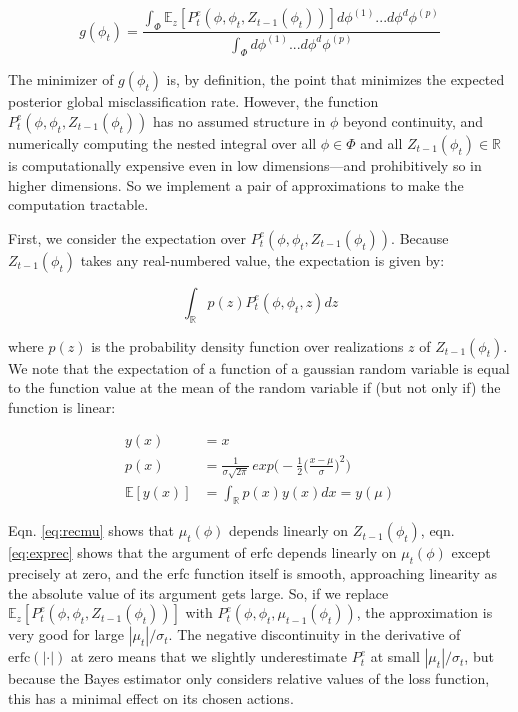 \documentclass[12pt, conference]{IEEEtran}
\begin{document}
\begin{equation}
    g(\phi_t) = \frac{\int_\Phi \mathbb{E}_{z}[P_t^e(\phi,\phi_t,Z_{t-1}(\phi_t))] d\phi^{(1)}...d\phi^d\phi^{(p)}}{\int_\Phi d\phi^{(1)}...d\phi^d\phi^{(p)}}
    \label{eq:objfull}
\end{equation}
\smallskip

The minimizer of $g(\phi_t)$ is, by definition, the point that minimizes the expected posterior global misclassification rate. However, the function $P_t^e(\phi,\phi_t,Z_{t-1}(\phi_t))$ has no assumed structure in $\phi$ beyond continuity, and numerically computing the nested integral over all $\phi\in\Phi$ and all $Z_{t-1}(\phi_t)\in\mathbb{R}$ is computationally expensive even in low dimensions---and prohibitively so in higher dimensions. So we implement a pair of approximations to make the computation tractable.

First, we consider the expectation over $P_t^e(\phi,\phi_t,Z_{t-1}(\phi_t))$. Because $Z_{t-1}(\phi_t)$ takes any real-numbered value, the expectation is given by:

\begin{equation}
    \int_\mathbb{R}p(z)P_t^e(\phi,\phi_t,z)dz
\end{equation}
\smallskip

where $p(z)$ is the probability density function over realizations $z$ of $Z_{t-1}(\phi_t)$. We note that the expectation of a function of a gaussian random variable is equal to the function value at the mean of the random variable if (but not only if) the function is linear:

\begin{align}
    y(x)&=x \nonumber \\
    p(x)&= \frac{1}{\sigma \sqrt{2\pi}}\,exp\Big(-\frac{1}{2}\big(\frac{x-\mu}{\sigma}\big)^2\Big)\nonumber \\
    \mathbb{E}[y(x)]& = \int_\mathbb{R}p(x)y(x)dx = y(\mu)
\end{align}
\smallskip

Eqn. \ref{eq:recmu} shows that $\mu_t(\phi)$ depends linearly on $Z_{t-1}(\phi_t)$, eqn. \ref{eq:exprec} shows that the argument of erfc depends linearly on $\mu_t(\phi)$ except precisely at zero, and the erfc function itself is smooth, approaching linearity as the absolute value of its argument gets large. So, if we replace $\mathbb{E}_{z}[P_t^e(\phi,\phi_t,Z_{t-1}(\phi_t))]$ with $P_t^e(\phi,\phi_t,\mu_{t-1}(\phi_t))$, the approximation is very good for large $|\mu_t|/\sigma_t$. The negative discontinuity in the derivative of $\text{erfc}(|\cdot|)$ at zero means that we slightly underestimate $P_t^e$ at small $|\mu_t|/\sigma_t$, but because the Bayes estimator only considers relative values of the loss function, this has a minimal effect on its chosen actions.
\end{document}
